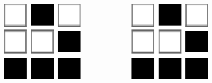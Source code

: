 \documentclass[dvipdfmx,cjk,xcolor=dvipsnames,envcountsect,notheorems,12pt]{beamer}
\theoremstyle{definition}
\begin{document}
\begin{frame}
\begin{columns}
\begin{column}{0.4\textwidth}
\begin{columns}
\begin{column}{0.33\textwidth}
          \includegraphics[width=\textwidth]{sample-image.eps}
        \end{column}
        \begin{column}{0.33\textwidth}
          \includegraphics[width=\textwidth]{sample-image.eps}

\end{column}
\end{columns}
\end{column}
\end{columns}
\end{frame}
\end{document}
